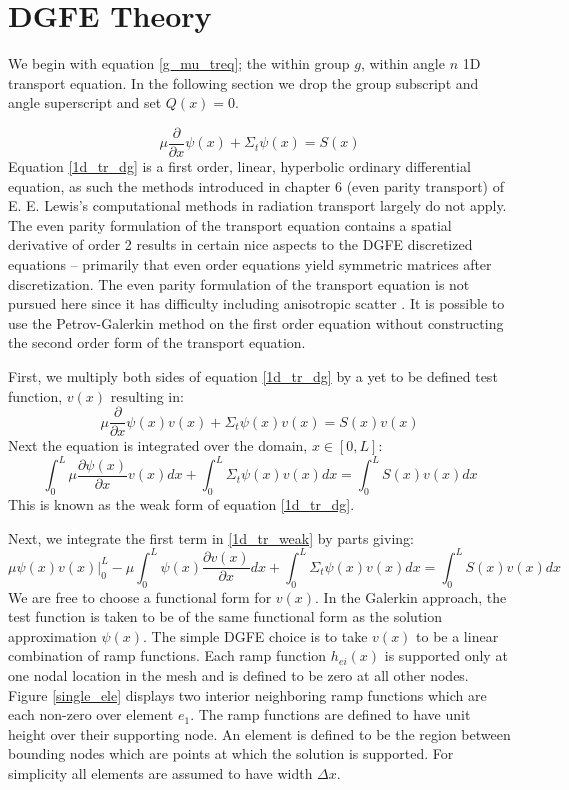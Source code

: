 \section{DGFE Theory}

We begin with equation \ref{g_mu_treq}; the within group $g$, within angle $n$ 1D transport equation.  In the following section we drop the group subscript and angle superscript and set $Q(x)=0$.

\begin{equation}
\mu \frac{\partial}{\partial x} \psi(x) + \Sigma_t \psi(x) = S(x)
\label{1d_tr_dg}
\end{equation}
Equation \ref{1d_tr_dg} is a first order, linear, hyperbolic ordinary differential equation, as such the methods introduced in chapter 6
(even parity transport) of E. E. Lewis’s computational methods in radiation transport largely do not apply. The even parity formulation of the transport equation contains a spatial derivative of order 2 results
in certain nice aspects to the DGFE discretized equations – primarily that even order equations yield
symmetric matrices after discretization. The even parity formulation of the transport equation is not pursued here
since it has difficulty including anisotropic scatter \cite{Lewis}. It is possible to use the Petrov-Galerkin method
on the first order equation without constructing the second order form of the transport equation.

First, we multiply both sides of equation \ref{1d_tr_dg} by a yet to be defined test function, $v(x)$ resulting in:
\begin{equation}
\mu \frac{\partial}{\partial x} \psi(x) v(x) + \Sigma_t \psi(x)v(x) = S(x)v(x)
\label{1d_tr_dg2}
\end{equation}
Next the equation is integrated over the domain, $x \in [0, L]$:
\begin{equation}
\int_0^L \mu \frac{\partial \psi(x)}{\partial x} v(x) dx + \int_0^L \Sigma_t \psi(x)v(x) dx =  \int_0^L S(x)v(x) dx
\label{1d_tr_weak}
\end{equation}
This is known as the weak form of equation \ref{1d_tr_dg}.

Next, we integrate the first term in \ref{1d_tr_weak} by parts giving:
\begin{equation}
\mu \psi(x)v(x)|_0^L- \mu \int_0^L  \psi(x) \frac{\partial v(x)}{\partial x} dx + \int_0^L \Sigma_t \psi(x)v(x) dx =  \int_0^L S(x)v(x) dx
\label{1d_tr_weak2}
\end{equation}
We are free to choose a functional form for $v(x)$. In the Galerkin approach, the test function is
taken to be of the same functional form as the solution approximation $\psi(x)$. The simple DGFE choice is to take $v(x)$ to be a
linear combination of ramp functions. Each ramp function $h_{ei}(x)$ is supported only at one nodal location in the mesh
and is defined to be zero at all other nodes. Figure \ref{single_ele} displays two interior neighboring ramp functions which are each non-zero over element $e_1$. The ramp functions are defined to have unit height over their supporting node.  An element is defined to be the region between bounding nodes which are points at which the solution is supported.  For simplicity all elements are assumed to have width $\Delta x$.

